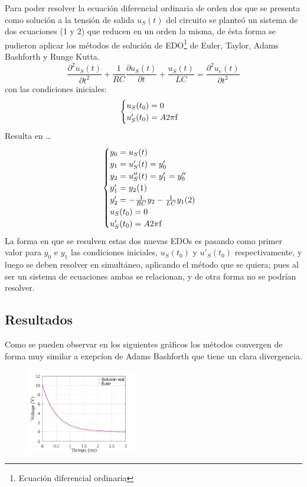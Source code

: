 \documentclass[letterpaper, 10 pt, conference]{ieeeconf}  %
\begin{document}
Para poder resolver la ecuaci\'on diferencial ordinaria de orden dos que se presenta como soluci\'on a la tensi\'on de salida $u_{S}(t)$ del circuito se plante\'o un sistema de dos ecuaciones (1 y 2) que reducen en un orden la misma, de \'esta forma se pudieron aplicar los m\'etodos de soluci\'on de EDO\footnote{Ecuaci\'on diferencial ordinaria} de Euler, Taylor, Adams Bashforth y Runge Kutta.
\[ \frac{ \partial^2 {u_{S}(t)}}{\partial t^2} + \frac{1}{RC}\frac{\partial{u_{S}(t)}}{\partial{t}} + \frac{u_{S}(t)}{LC} = \frac{\partial^2{u_{e}(t)}}{{\partial{t^2}}} \]
con las condiciones iniciales:
\[ \begin{cases} u_{S}(t_{0}) = 0 \\ u'_{S}(t_{0}) = A2\pi$f$ \end{cases} \] 
Resulta en \ldots
\[ \begin{cases} y_0 = u_{S}(t) \\ y_1 = u'_{S}(t) = y'_0 \\ y_2 = u''_{S}(t) = y'_1 = y''_0 \\ y'_1 = y_2 (1) \\ y'_2 = - \frac{1}{RC} y_2 - \frac{1}{LC} y_1 (2) \\ u_{S}(t_{0}) = 0 \\ u'_{S}(t_{0}) = A2\pi$f$ \end{cases} \]
La forma en que se resulven estas dos nuevas EDOs es pasando como primer valor para $y_0$ e $y_1$ las condiciones iniciales, $u_{S}(t_{0})$ y $u'_{S}(t_{0})$ respectivamente, y luego se deben resolver en simult\'aneo, aplicando el m\'etodo que se quiera; pues al ser un sistema de ecuaciones ambas se relacionan, y de otra forma no se podr\'ian resolver.

\subsection{Resultados}

Como se pueden observar en los siguientes gr\'aficos los m\'etodos convergen de forma muy similar a exepc\'ion de Adams Bashforth que tiene un clara divergencia.

\begin{figure}[H]
\centering
\includegraphics[width=0.43\textwidth]{../plots/ej4/ej4-metodos-3.png}
\end{figure}
\end{document}
